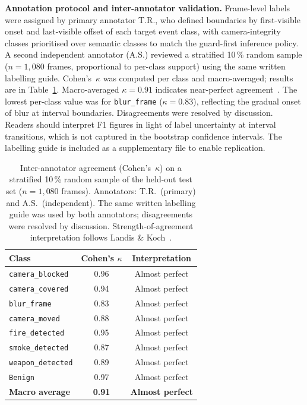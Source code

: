 \documentclass[a4paper,fleqn]{cas-dc}
\begin{document}
\textbf{Annotation protocol and inter-annotator validation.}
Frame-level labels were assigned by primary annotator T.R., who defined boundaries by first-visible onset and last-visible offset of each target event class, with camera-integrity classes prioritised over semantic classes to match the guard-first inference policy. A second independent annotator (A.S.) reviewed a stratified 10\,\% random sample ($n=1{,}080$ frames, proportional to per-class support) using the same written labelling guide. Cohen's~$\kappa$ was computed per class and macro-averaged; results are in Table~\ref{tab:interrater}. Macro-averaged $\kappa = 0.91$ indicates near-perfect agreement~\citep{landis1977measurement}. The lowest per-class value was for \texttt{blur\_frame} ($\kappa = 0.83$), reflecting the gradual onset of blur at interval boundaries. Disagreements were resolved by discussion. Readers should interpret F1 figures in light of label uncertainty at interval transitions, which is not captured in the bootstrap confidence intervals. The labelling guide is included as a supplementary file to enable replication.
 
\begin{table}[!ht]
\caption{Inter-annotator agreement (Cohen's~$\kappa$) on a stratified
10\,\% random sample of the held-out test set ($n=1{,}080$ frames).
Annotators: T.R.\ (primary) and A.S.\ (independent). The same written
labelling guide was used by both annotators; disagreements were resolved
by discussion. Strength-of-agreement interpretation follows
Landis \& Koch~\citep{landis1977measurement}.}
\label{tab:interrater}
\centering\small\setlength{\tabcolsep}{6pt}
\begin{tabular}{lcc}
\toprule
\textbf{Class} & \textbf{Cohen's $\kappa$} & \textbf{Interpretation} \\
\midrule
\texttt{camera\_blocked}  & 0.96 & Almost perfect \\
\texttt{camera\_covered}  & 0.94 & Almost perfect \\
\texttt{blur\_frame}      & 0.83 & Almost perfect \\
\texttt{camera\_moved}    & 0.88 & Almost perfect \\
\texttt{fire\_detected}   & 0.95 & Almost perfect \\
\texttt{smoke\_detected}  & 0.87 & Almost perfect \\
\texttt{weapon\_detected} & 0.89 & Almost perfect \\
\texttt{Benign}           & 0.97 & Almost perfect \\
\midrule
\textbf{Macro average}    & \textbf{0.91} & \textbf{Almost perfect} \\
\bottomrule
\end{tabular}
\end{table}
 
\end{document}
